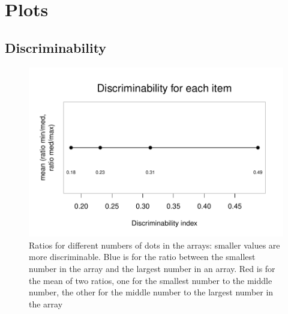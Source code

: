 \documentclass[a4paper,12pt]{article}\usepackage[]{graphicx}\usepackage[]{color}
\makeatletter
\def\maxwidth{ %
  \ifdim\Gin@nat@width>\linewidth
    \linewidth
  \else
    \Gin@nat@width
  \fi
}
\newenvironment{knitrout}{}{} %
\makeatother
\begin{document}
\clearpage
\section{Plots}
\clearpage
\subsection{Discriminability}

\begin{knitrout}\scriptsize
{}\color{fgcolor}\begin{figure}[hbtp]

{\centering \includegraphics[width=\maxwidth]{figure/graphics-showCompression-1} 

}

\caption[Ratios for different numbers of dots in the arrays]{Ratios for different numbers of dots in the arrays: smaller values are more discriminable. Blue is for the ratio between the smallest number in the array and the largest number in an array. Red is for the mean of two ratios, one for the smallest number to the middle number, the other for the middle number to the largest number in the array}\label{fig:showCompression}
\end{figure}


\end{knitrout}

\clearpage
\end{document}

